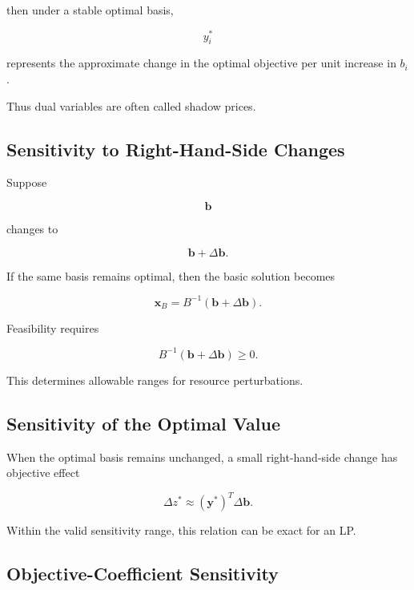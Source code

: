 then under a stable optimal basis,

\[
\boxed{
y_i^*
}
\]

represents the approximate change in the optimal objective per unit
increase in \(b_i\).

Thus dual variables are often called shadow prices.

\subsection{Sensitivity to Right-Hand-Side Changes}
\label{subsec:lp-rhs-sensitivity}

Suppose

\[
\mathbf{b}
\]

changes to

\[
\mathbf{b}+\Delta\mathbf{b}.
\]

If the same basis remains optimal, then the basic solution becomes

\[
\boxed{
\mathbf{x}_B
=
B^{-1}
(
\mathbf{b}+\Delta\mathbf{b}
).
}
\]

Feasibility requires

\[
\boxed{
B^{-1}
(
\mathbf{b}+\Delta\mathbf{b}
)
\geq0.
}
\]

This determines allowable ranges for resource perturbations.

\subsection{Sensitivity of the Optimal Value}
\label{subsec:lp-optimal-value-sensitivity}

When the optimal basis remains unchanged, a small right-hand-side change
has objective effect

\[
\boxed{
\Delta z^*
\approx
(\mathbf{y}^*)^T
\Delta\mathbf{b}.
}
\]

Within the valid sensitivity range, this relation can be exact for an LP.

\subsection{Objective-Coefficient Sensitivity}
\label{subsec:lp-objective-sensitivity}

